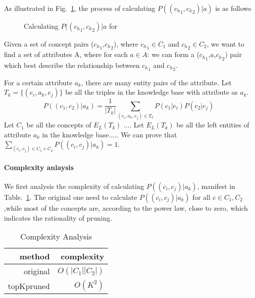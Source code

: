 \begin{example}[Calculating $P(({c_h}_{1},{c_h}_{2}) |a)$]
\label{exa:pggga}
As illustrated in Fig.~\ref{fig:bipartite}, the process of calculating $P(({c_h}_{1},{c_h}_{2}) |a)$ is as follows\term{}
\end{example}


\begin{figure}[!htb]
\centering {}
\caption{Calculating $P(({c_h}_{1},{c_h}_{2}) |a$ for \term{}} \label{fig:bipartite}
\end{figure}

Given a set of concept pairs (${c_h}_1$,${c_h}_2$), where ${c_h}_1\in C_1$ and ${c_h}_2\in C_2$, we want to find a set of attributes A, where for each $a \in A$:
we can form a (${c_h}_1$,$a$,${c_h}_2$) pair which best describe the relationship between ${c_h}_1$ and ${c_h}_2$.



For a certain attribute $a_k$, there are many entity pairs of the attribute.
Let $T_k=\{(e_i, a_k, e_j)\}$ be all the triples in the knowledge base with attribute as $a_k$.
\begin{equation}
 P((c_1, c_2) |a_k) = \frac{1}{|T_k|}\sum_{  (e_{i},a_k,e_{j})\in T_k } P(c_1|e_{i})P(c_2|e_{j})
 \end{equation}
Let $C_1$ be all the concepts of $E_L(T_k)$ .... Let $E_L(T_k)$ be all the left entities of attribute $a_k$ in the knowledge base..... We can prove that $\sum_{(c_i,c_j)\in C_1\times C_2} P((c_i, c_j)|a_k)=1$.

\paragraph{Complexity anlaysis}

We first analysis the complexity of calculating $P((c_i, c_j)|a_k)$, manifest in Table.~\ref{tab:complexity}. The original one need to calculate $P((c_i, c_j)|a_k)$ for all $c \in C_1,C_2 $,while most of the concepts are, according to the power law, close to zero, which indicates the rationality of pruning.

\begin{table}[htbp]
  \centering
  \caption{Complexity Analysis}
    \begin{tabular}{rr}
    \toprule
    method & complexity \\
    \midrule
    original &  $O(|C_1||C_2|)$ \\
    topKpruned & $O(K^2)$ \\
    \bottomrule
    \end{tabular}%
  \label{tab:complexity}%
\end{table}%



